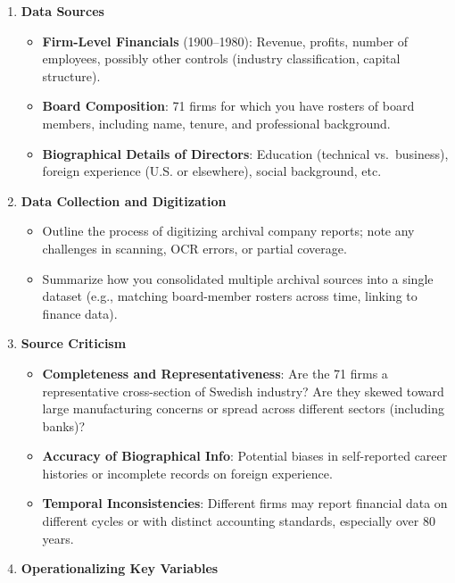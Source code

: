\documentclass[
]{article}
\providecommand{\tightlist}{%
  \setlength{\itemsep}{0pt}\setlength{\parskip}{0pt}}\usepackage{longtable,booktabs,array}
\begin{document}
\begin{enumerate}
\def\labelenumi{\arabic{enumi}.}
\tightlist
\item
  \textbf{Data Sources}

  \begin{itemize}
  \tightlist
  \item
    \textbf{Firm-Level Financials} (1900--1980): Revenue, profits,
    number of employees, possibly other controls (industry
    classification, capital structure).\\
  \item
    \textbf{Board Composition}: 71 firms for which you have rosters of
    board members, including name, tenure, and professional
    background.\\
  \item
    \textbf{Biographical Details of Directors}: Education (technical
    vs.~business), foreign experience (U.S. or elsewhere), social
    background, etc.
  \end{itemize}
\item
  \textbf{Data Collection and Digitization}

  \begin{itemize}
  \tightlist
  \item
    Outline the process of digitizing archival company reports; note any
    challenges in scanning, OCR errors, or partial coverage.\\
  \item
    Summarize how you consolidated multiple archival sources into a
    single dataset (e.g., matching board-member rosters across time,
    linking to finance data).
  \end{itemize}
\item
  \textbf{Source Criticism}

  \begin{itemize}
  \tightlist
  \item
    \textbf{Completeness and Representativeness}: Are the 71 firms a
    representative cross-section of Swedish industry? Are they skewed
    toward large manufacturing concerns or spread across different
    sectors (including banks)?\\
  \item
    \textbf{Accuracy of Biographical Info}: Potential biases in
    self-reported career histories or incomplete records on foreign
    experience.\\
  \item
    \textbf{Temporal Inconsistencies}: Different firms may report
    financial data on different cycles or with distinct accounting
    standards, especially over 80 years.
  \end{itemize}
\item
  \textbf{Operationalizing Key Variables}


\end{enumerate}
\end{document}
